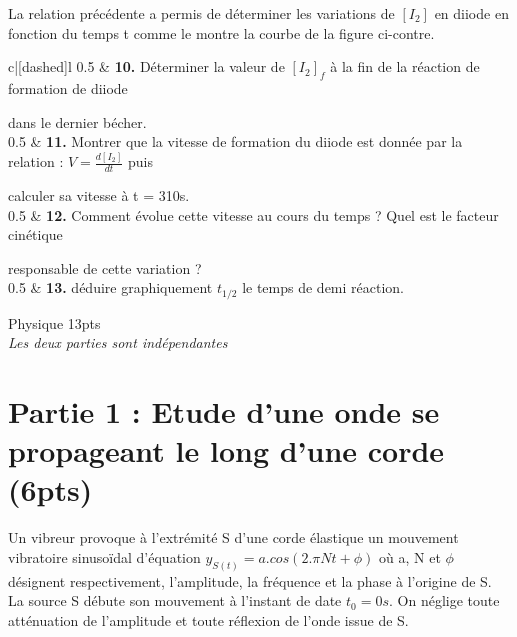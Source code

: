 \documentclass[12pt]{article}
\begin{document}
La relation précédente a permis de déterminer les variations de $[I_2]$ en diiode en fonction du temps t
comme le montre la courbe de la figure  ci-contre.

\begin{tblr}{c|[dashed]l}
	0.5  & \textbf{10. } Déterminer la valeur de $[I_2]_f$ à la fin de la réaction de formation de diiode

	dans le dernier bécher.\\
	0.5 & \textbf{11. }Montrer que la vitesse de formation du diiode est
	donnée par la relation : $V=\frac{d[I_2]}{dt} $ puis 

	calculer sa vitesse à t = 310s.\\
	0.5 & \textbf{12. }Comment évolue cette vitesse au cours du temps ?
Quel est le facteur cinétique 

responsable de cette
variation ?   \\
	0.5 & \textbf{13. } déduire graphiquement $t_{1/2}$  le temps de demi réaction. \\
\end{tblr}

\begin{center}
\hrulefill
\Large{Physique 13pts}
\hrulefill\\
    \emph{Les deux parties sont indépendantes}
\end{center}

\section*{Partie 1 : Etude d’une onde se propageant le long d’une corde \dotfill(6pts) }

Un vibreur provoque à l’extrémité S d’une corde élastique un mouvement vibratoire sinusoïdal
d’équation $y_{S(t)} = a.cos (2.\pi Nt + \phi )$ où a, N et $\phi$ désignent respectivement, l'amplitude, la fréquence et la
phase à l’origine de S. La source S débute son mouvement à l’instant de date $t_0 = 0 s$. 
On néglige toute atténuation de l’amplitude et toute réflexion de l’onde issue de S.
\end{document}
